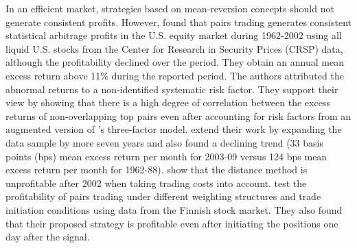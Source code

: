 \documentclass[a4paper,12pt]{report}
\begin{document}
In an efficient market, strategies based on mean-reversion concepts should not generate consistent profits. However, \citet*{ggr06} found that pairs trading generates consistent statistical arbitrage profits in the U.S. equity market during 1962-2002 using all liquid U.S. stocks from the Center for Research in Security Prices (CRSP) data, although the profitability declined over the period. They obtain an annual mean excess return above 11\% during the reported period. The authors attributed the abnormal returns to a non-identified systematic risk factor. They support their view by showing that there is a high degree of correlation between the excess returns of non-overlapping top pairs even after accounting for risk factors from an augmented version of \citet*{ff93}'s three-factor model. \citet*{df10} extend their work by expanding the data sample by more seven years and also found a declining trend (33 basis points (bps) mean excess return per month for 2003-09 versus 124 bps mean excess return per month for 1962-88). \citet*{df12} show that the distance method is unprofitable after 2002 when taking trading costs into account. \citet*{bv12} test the profitability of pairs trading under different weighting structures and trade initiation conditions using data from the Finnish stock market. They also found that their proposed strategy is profitable even after initiating the positions one day after the signal.
\end{document}
